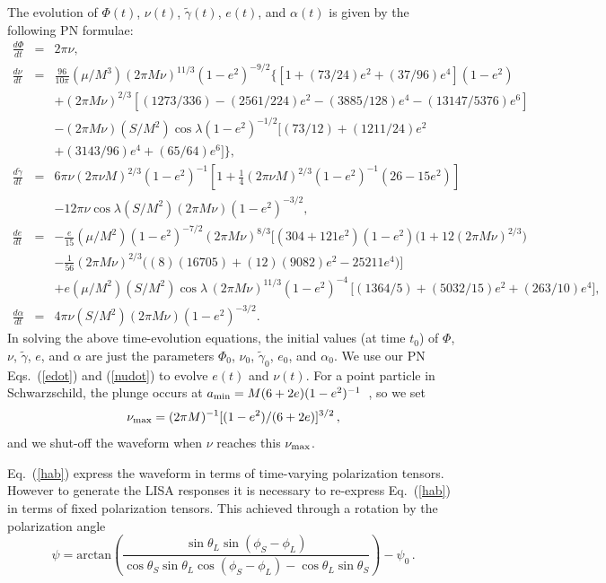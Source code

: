 \documentclass[12pt]{iopart}
\def\be{\begin{equation}}
\def\ee{\end{equation}}
\begin{document}
The evolution of $\Phi(t)$, $\nu(t)$, $\tilde\gamma(t)$, $e(t)$, and $\alpha(t)$ is given by the following PN formulae:
\begin{eqnarray}
\frac{d\Phi}{dt} &=& 2\pi\nu, \label{Phidot} \\
\frac{d\nu}{dt} &=&
\frac{96}{10\pi}(\mu/M^3)(2\pi M\nu)^{11/3}(1-e^2)^{-9/2}
\bigl\{
\left[1+(73/24)e^2+(37/96)e^4\right](1-e^2) \nonumber \\
&&+ (2\pi M\nu)^{2/3}\left[(1273/336)-(2561/224)e^2-(3885/128)e^4
-(13147/5376)e^6 \right] \nonumber \\
&&- (2\pi M\nu)(S/M^2)\cos\lambda (1-e^2)^{-1/2}\bigl[(73/12)
+ (1211/24)e^2 \nonumber \\
&&+(3143/96)e^4 +(65/64)e^6 \bigr]
\bigr\}, \label{nudot} \\
%
\frac{d\tilde\gamma}{dt} &=& 6\pi\nu(2\pi\nu M)^{2/3} (1-e^2)^{-1}
\left[1+\frac{1}{4}(2\pi\nu M)^{2/3} (1-e^2)^{-1}(26-15e^2)\right] \nonumber \\
&&-12\pi\nu\cos\lambda (S/M^2) (2\pi M\nu)(1-e^2)^{-3/2},
\label{Gamdot} \\
%
\frac{de}{dt}  &=& -\frac{e}{15}(\mu/M^2) (1-e^2)^{-7/2} (2\pi M\nu)^{8/3}
\bigl[(304+121e^2)(1-e^2)\bigl(1 + 12 (2\pi M\nu)^{2/3}\bigr) \, \nonumber \\
&&- \frac{1}{56}(2\pi M\nu)^{2/3}\bigl( (8)(16705) + (12)(9082)e^2 - 25211e^4 \bigr)\bigr]\,
\nonumber \\
&&+ e (\mu/M^2)(S/M^2)\cos\lambda\,(2\pi M\nu)^{11/3}(1-e^2)^{-4}
\, \bigl[(1364/5) + (5032/15)e^2 + (263/10)e^4\bigr] ,
\label{edot} \\
%
\frac{d\alpha}{dt} &=& 4\pi\nu (S/M^2) (2\pi M\nu)(1-e^2)^{-3/2}.
\label{alphadot}
\end{eqnarray}
In solving the above time-evolution equations, the initial values (at time $t_0$) of $\Phi$, $\nu$, $\tilde\gamma$, $e$, and $\alpha$ are just the parameters $\Phi_0$, $\nu_0$, $\tilde\gamma_0$, $e_0$, and $\alpha_0$. We use our PN Eqs.~(\ref{edot}) and (\ref{nudot}) to evolve $e(t)$ and $\nu(t)$. For a point particle in Schwarzschild, the plunge occurs at
$a_{\rm min} = M (6 + 2e)(1-e^2)^{-1}$~\cite{Cutler-Kennefick-Poisson},
so we set
\be\label{numax}
\nu_{\rm max} = (2\pi M)^{-1}[(1-e^2)/(6 + 2e)]^{3/2} \, ,
\ee
and we shut-off the waveform when $\nu$ reaches this $\nu_{\rm max}$.

Eq.~(\ref{hab}) express the waveform in terms of time-varying polarization tensors. However to generate the LISA responses it is necessary to re-express Eq.~(\ref{hab}) in terms of fixed polarization tensors. This achieved through a rotation by the polarization angle
\begin{equation}\label{psiSL}
\psi = \mathrm{arctan}\left(\frac{\sin\theta_L \sin(\phi_S-\phi_L)}{\cos \theta_S \sin \theta_L \cos(\phi_S - \phi_L) - \cos\theta_L \sin\theta_S}\right) - \psi_0\,.
\end{equation}
\end{document}
